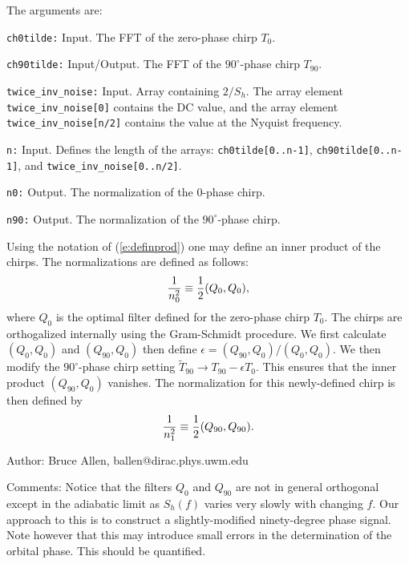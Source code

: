 The arguments are:
\begin{description}
\item{\tt ch0tilde:} Input.  The FFT of the zero-phase chirp $T_0$.
\item{\tt ch90tilde:} Input/Output.  The FFT of the $90^\circ$-phase chirp $T_{90}$.
\item{\tt twice\_inv\_noise:} Input.  Array containing $2/S_h$.
The array element {\tt twice\_inv\_noise[0]} contains
   the DC value, and the array element {\tt twice\_inv\_noise[n/2]}
   contains the value at the Nyquist frequency.
\item{\tt n:} Input. Defines the length of the arrays: {\tt ch0tilde[0..n-1]}, {\tt ch90tilde[0..n-1]},
  and {\tt twice\_inv\_noise[0..n/2]}.
\item{\tt n0:} Output.  The normalization of the 0-phase chirp.
\item{\tt n90:} Output.  The normalization of the $90^\circ$-phase chirp.
\end{description}

Using the notation of (\ref{e:definprod}) one may define an inner product of the
chirps.  The normalizations are defined as follows:
\begin{equation}
{1 \over n_0^2} \equiv {1 \over 2} (Q_0,Q_0),
\end{equation}
where $Q_0$ is the optimal filter defined for the zero-phase chirp $T_0$.
The chirps are orthogalized internally using the Gram-Schmidt procedure.
We first calculate $(Q_0,Q_0)$ and $(Q_{90},Q_{0})$ then define
$\epsilon = (Q_{90},Q_{0})/(Q_0,Q_0)$.  We then modify the $90^\circ$-phase chirp
setting
$\tilde T_{90} \rightarrow T_{90} - \epsilon T_0$.  This ensures that the
inner product $(Q_{90},Q_{0})$ vanishes.  The normalization for this newly-defined
chirp is then defined by
\begin{equation}
{1 \over n_1^2} \equiv {1 \over 2} (Q_{90},Q_{90}).
\end{equation}
\begin{description}
\item{Author:}
Bruce Allen, ballen@dirac.phys.uwm.edu
\item{Comments:}
Notice that the filters $Q_0$ and $Q_{90}$ are not in general
orthogonal except in the adiabatic limit as $S_h(f)$ varies very slowly
with changing $f$.  Our approach to this is to construct a
slightly-modified ninety-degree phase signal.  Note however that this
may introduce small errors in the determination of the orbital phase.
This should be quantified.
\end{description}
\clearpage


